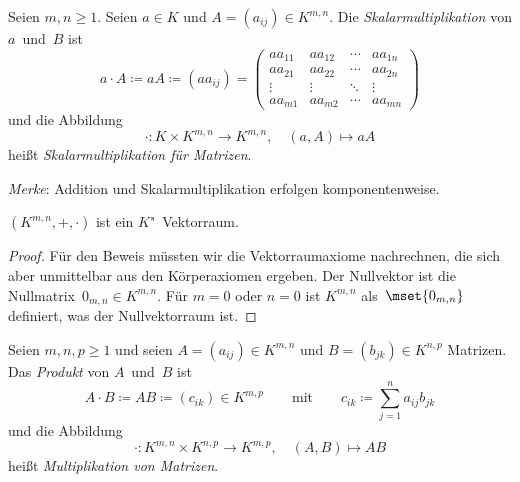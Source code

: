 \documentclass[a4paper]{article}
\begin{document}
\begin{definition}[Skalarmultiplikation]
    Seien $m,n \geq 1$. Seien $a \in K$ und $A = (a_{ij}) \in K^{m,n}$. Die \emph{Skalarmultiplikation} von $a$~und~$B$ ist
    \begin{equation*}
        a\cdot A \coloneqq aA \coloneqq (aa_{ij}) =
        \begin{pmatrix}
            aa_{11} & aa_{12} & \cdots & aa_{1n} \\
            aa_{21} & aa_{22} & \cdots & aa_{2n} \\
            \vdots  & \vdots  & \ddots & \vdots  \\
            aa_{m1} & aa_{m2} & \cdots & aa_{mn}
        \end{pmatrix}
    \end{equation*}
    und die Abbildung
    \begin{equation*}
        \cdot\colon K \times K^{m,n} \to K^{m,n},\quad (a,A) \mapsto aA
    \end{equation*}
    heißt \emph{Skalarmultiplikation für Matrizen}.
\end{definition}

\emph{Merke}: Addition und Skalarmultiplikation erfolgen komponentenweise.

\begin{lemma}
    $(K^{m,n},+,\cdot)$ ist ein $K$"~Vektorraum.
\end{lemma}

\begin{proof}
    Für den Beweis müssten wir die Vektorraumaxiome nachrechnen, die sich aber unmittelbar aus den Körperaxiomen ergeben. Der Nullvektor ist die Nullmatrix~$0_{m,n} \in K^{m,n}$. Für $m = 0$ oder $n = 0$ ist $K^{m,n}$ als~$\mset{0_{m,n}}$ definiert, was der Nullvektorraum ist.
\end{proof}

\begin{definition}[Produkt]
    Seien $m,n,p \geq 1$ und seien $A = (a_{ij}) \in K^{m,n}$ und $B = (b_{jk}) \in K^{n,p}$ Matrizen. Das \emph{Produkt} von $A$~und~$B$ ist
    \begin{equation*}
        A\cdot B \coloneqq AB \coloneqq (c_{ik}) \in K^{m,p} \qquad\text{mit}\qquad c_{ik} \coloneqq \sum_{j=1}^n a_{ij}b_{jk}
    \end{equation*}
    und die Abbildung
    \begin{equation*}
        \cdot\colon K^{m,n} \times K^{n,p} \to K^{m,p},\quad (A,B) \mapsto AB
    \end{equation*}
    heißt \emph{Multiplikation von Matrizen}.
\end{definition}
\end{document}
